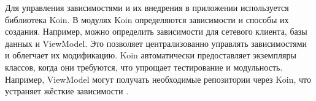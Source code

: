 Для управления зависимостями и их внедрения в приложении используется библиотека Koin. В модулях Koin определяются зависимости и способы их создания. Например, можно определить зависимости для сетевого клиента, базы данных и ViewModel. Это позволяет централизованно управлять зависимостями и облегчает их модификацию. Koin автоматически предоставляет экземпляры классов, когда они требуются, что упрощает тестирование и модульность. Например, ViewModel могут получать необходимые репозитории через Koin, что устраняет жёсткие зависимости \cite{refj}.
